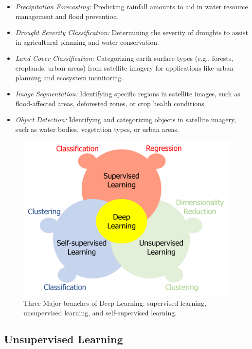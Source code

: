 \begin{itemize}
    \item \textit{Precipitation Forecasting:} Predicting rainfall amounts to aid in water resource management and flood prevention.
\item \textit{Drought Severity Classification:} Determining the severity of droughts to assist in agricultural planning and water conservation.
\item \textit{Land Cover Classification:} Categorizing earth surface types (e.g., forests, croplands, urban areas) from satellite imagery for applications like urban planning and ecosystem monitoring.
\item \textit{Image Segmentation:} Identifying specific regions in satellite images, such as flood-affected areas, deforested zones, or crop health conditions.
\item \textit{Object Detection:} Identifying and categorizing objects in satellite imagery, such as water bodies, vegetation types, or urban areas.
\end{itemize}


\begin{figure}[h!]
    \centering
    \includegraphics[width=\linewidth]{images/supervised_learning_classification_image.png}
    \caption{Three Major branches of Deep Learning: supervised learning, unsupervised learning, and self-supervised learning.}
    \label{fig:supervised}
\end{figure}


\subsection{Unsupervised Learning }

